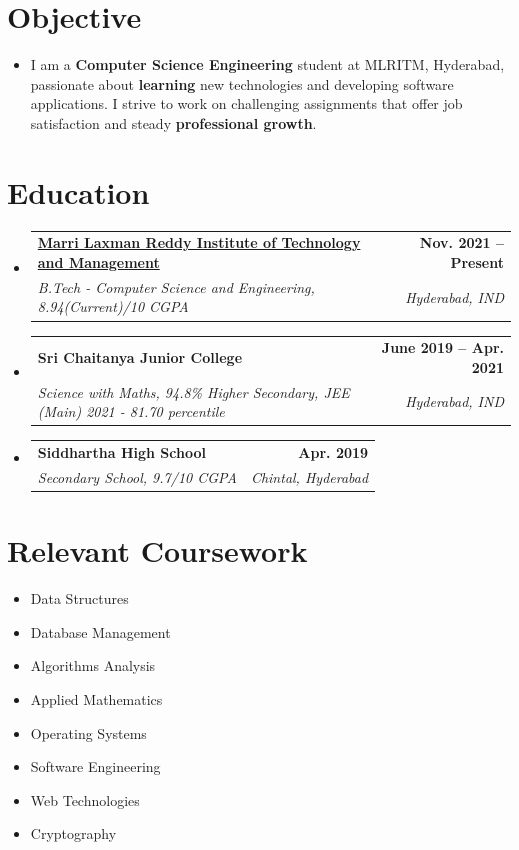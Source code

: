 \documentclass[a4paper,11pt]{article}
\makeatletter
\newcommand{\resumeSubheading}[4]{
  \vspace{-2pt}\item
    \begin{tabular*}{0.97\textwidth}[t]{l@{\extracolsep{\fill}}r}
      \textbf{#1} & \textbf{\small #2} \\
      \textit{\small#3} & \textit{\small #4} \\
    \end{tabular*}\vspace{-7pt}
}
\newcommand{\resumeSubHeadingListStart}{\begin{itemize}[leftmargin=0.15in, label={}]}
\newcommand{\resumeSubHeadingListEnd}{\end{itemize}}
\makeatother
\begin{document}
\section{Objective}
  \begin{itemize}[leftmargin=0.15in, label={}]
    \item \fontsize{10}{12} {\selectfont
    I am a \textbf{Computer Science Engineering} student at MLRITM, Hyderabad, passionate about \textbf{learning} new technologies and developing software applications. I strive to work on challenging assignments that offer job satisfaction and steady \textbf{professional growth}.}
  \end{itemize}

\vspace{-15pt}
\section{Education}
  \resumeSubHeadingListStart
    \resumeSubheading
      {\href{https://mlritm.ac.in}{Marri Laxman Reddy Institute of Technology and Management}}{Nov. 2021 -- Present}
      {B.Tech - Computer Science and Engineering, 8.94(Current)/10 CGPA}{Hyderabad, IND}
    \resumeSubheading
      {Sri Chaitanya Junior College}{June 2019 -- Apr. 2021}
      {Science with Maths, 94.8\% Higher Secondary, JEE (Main) 2021 - 81.70 percentile}{Hyderabad, IND}
    \resumeSubheading
      {Siddhartha High School}{Apr. 2019}
      {Secondary School, 9.7/10 CGPA}{Chintal, Hyderabad}
  \resumeSubHeadingListEnd

\section{Relevant Coursework}
        \begin{multicols}{4}
            \begin{itemize}[itemsep=-3pt, parsep=3pt]
              \small
                \item Data Structures
                \item Database Management
                \item Algorithms Analysis
                \item Applied Mathematics
                \item Operating Systems
                \item Software Engineering
                \item Web Technologies
                \item Cryptography
              \end{itemize}
        \end{multicols}
        \vspace*{2.0\multicolsep}
\end{document}

